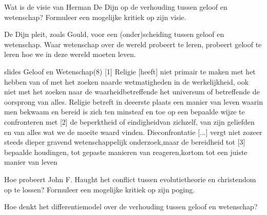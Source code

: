 \documentclass[main.tex]{subfiles}
\begin{document}
\begin{examenvraag}
    \begin{vraag}
        Wat is de visie van Herman De Dijn op de verhouding tussen geloof en wetenschap? Formuleer een mogelijke kritiek op zijn visie.
    \end{vraag}

    \begin{antwoord}
    	De Dijn pleit, zoals Gould, voor een (onder)scheiding tussen geloof en wetenschap. 
    	Waar wetenschap over de wereld probeert te leren, probeert geloof te leren hoe we in deze wereld moeten leven.
    	
    		\begin{citaat}{slides Geloof en Wetenschap(8)}
    			[1] Religie [heeft] niet primair te maken met het hebben van of met het zoeken naarde wetmatigheden in de werkelijkheid, ook niet met het zoeken naar de waarheidbetreffende het universum of betreffende de oorsprong van alles. Religie betreft in deeerste plaats een manier van leven waarin men bekwaam en bereid is zich ten minsteaf en toe op een bepaalde wijze te confronteren met [2] de beperktheid of eindigheidvan zichzelf, van zijn geliefden en van alles wat we de moeite waard vinden. Dieconfrontatie [...] vergt niet zozeer steeds dieper gravend wetenschappelijk onderzoek,maar de bereidheid tot [3] bepaalde houdingen, tot gepaste manieren van reageren,kortom tot een juiste manier van leven
    		\end{citaat}
    	
    \end{antwoord}
\end{examenvraag}


\begin{examenvraag}
    \begin{vraag}
        Hoe probeert John F. Haught het conflict tussen evolutietheorie en christendom op te lossen? Formuleer een mogelijke kritiek op zijn poging.
    \end{vraag}

    \begin{antwoord}
    \end{antwoord}
\end{examenvraag}


\begin{examenvraag}
    \begin{vraag}
    Hoe denkt het differentiemodel over de verhouding tussen geloof en wetenschap?
    \end{vraag}

    \begin{antwoord}
    \end{antwoord}
\end{examenvraag}
\end{document}
